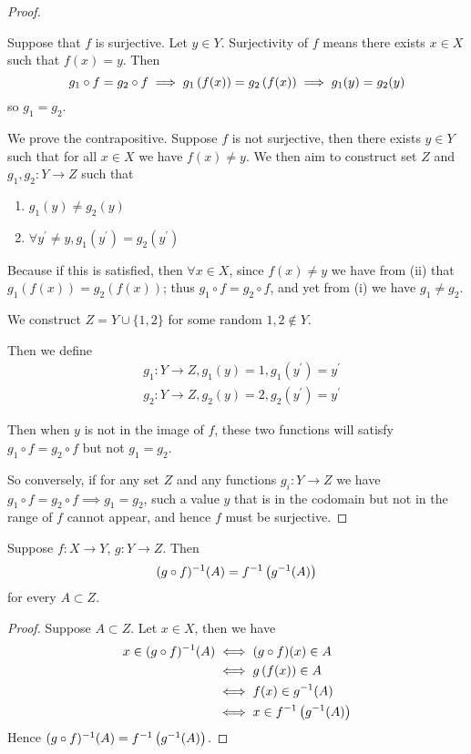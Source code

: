 \begin{proof} \

\fbox{$\implies$} Suppose that $f$ is surjective. Let $y\in Y$. Surjectivity of $f$ means there exists $x\in X$ such that $f(x)=y$. Then
\[g_1\circ f=g_2 \circ f\implies g_1\left(f(x)\right)=g_2\left(f(x)\right)\implies g_1(y)=g_2(y) \]
so $g_1=g_2$.

\fbox{$\impliedby$} We prove the contrapositive. Suppose $f$ is not surjective, then there exists $y \in Y$ such that for all $x \in X$ we have $f(x)\neq y$. We then aim to construct set $Z$ and $g_1,g_2\colon Y\to Z$ such that
\begin{enumerate}[label=(\roman*)]
\item $g_1(y) \neq g_2(y)$
\item $\forall y^\prime \neq y, g_1(y^\prime)=g_2(y^\prime)$
\end{enumerate}

Because if this is satisfied, then $\forall x \in X$, since $f(x)\neq y$ we have from (ii) that $g_1(f(x))=g_2(f(x))$; thus $g_1 \circ f=g_2 \circ f$, and yet from (i) we have $g_1 \neq g_2$.

We construct $Z=Y\cup\{1,2\}$ for some random $1,2 \notin Y$.

Then we define
\begin{align*}
&g_1\colon Y\to Z,g_1(y)=1,g_1(y^\prime)=y^\prime\\
&g_2\colon Y\to Z,g_2(y)=2,g_2(y^\prime)=y^\prime
\end{align*}

Then when $y$ is not in the image of $f$, these two functions will satisfy $g_1 \circ f=g_2 \circ f$ but not $g_1=g_2$.

So conversely, if for any set $Z$ and any functions $g_i\colon Y \to Z$ we have $g_1 \circ f=g_2 \circ f \implies g_1=g_2$, such a value $y$ that is in the codomain but not in the range of $f$ cannot appear, and hence $f$ must be surjective.
\end{proof}

\begin{lemma}
Suppose $f\colon X\to Y$, $g\colon Y\to Z$. Then
\[(g\circ f)^{-1}(A)=f^{-1}\left(g^{-1}(A)\right)\]
for every $A\subset Z$.
\end{lemma}

\begin{proof}
Suppose $A\subset Z$. Let $x\in X$, then we have
\begin{align*}
x\in(g\circ f)^{-1}(A)
&\iff (g\circ f)(x)\in A\\
&\iff g\left(f(x)\right)\in A\\
&\iff f(x)\in g^{-1}(A)\\
&\iff x\in f^{-1}\left(g^{-1}(A)\right)
\end{align*}
Hence $(g\circ f)^{-1}(A)=f^{-1}\left(g^{-1}(A)\right)$.
\end{proof}

